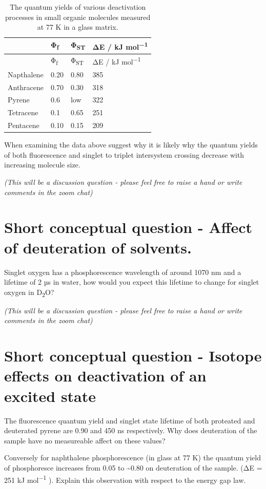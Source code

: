 \documentclass[
]{book}
\begin{document}
\begin{longtable}[]{@{}llll@{}}
\caption{\label{tab:smallmolQY} The quantum yields of various deactivation processes in small organic molecules measured at 77 K in a glass matrix.}\tabularnewline
\toprule
& Φ\textsubscript{f} & Φ\textsubscript{ST} & ΔE / kJ mol\textsuperscript{−1}\tabularnewline
\midrule
\endfirsthead
\toprule
& Φ\textsubscript{f} & Φ\textsubscript{ST} & ΔE / kJ mol\textsuperscript{−1}\tabularnewline
\midrule
\endhead
Napthalene & 0.20 & 0.80 & 385\tabularnewline
Anthracene & 0.70 & 0.30 & 318\tabularnewline
Pyrene & 0.6 & low & 322\tabularnewline
Tetracene & 0.1 & 0.65 & 251\tabularnewline
Pentacene & 0.10 & 0.15 & 209\tabularnewline
\bottomrule
\end{longtable}

When examining the data above suggest why it is likely why the quantum yields of both fluorescence and singlet to triplet intersystem crossing decrease with increasing molecule size.

\emph{(This will be a discussion question - please feel free to raise a hand or write comments in the zoom chat)}

\hypertarget{sec:dsolvent}{%
\section{Short conceptual question - Affect of deuteration of solvents.}\label{sec:dsolvent}}

Singlet oxygen has a phosphorescence wavelength of around 1070 nm and a lifetime of 2 µs in water, how would you expect this lifetime to change for singlet oxygen in D\textsubscript{2}O?

\emph{(This will be a discussion question - please feel free to raise a hand or write comments in the zoom chat)}

\hypertarget{sec:isotope}{%
\section{Short conceptual question - Isotope effects on deactivation of an excited state}\label{sec:isotope}}

The fluorescence quantum yield and singlet state lifetime of both proteated and deuterated pyrene are 0.90 and 450 ns respectively. Why does deuteration of the sample have no measureable affect on these values?

Conversely for naphthalene phosphorescence (in glass at 77 K) the quantum yield of phosphoresce increases from 0.05 to \textasciitilde0.80 on deuteration of the sample. (ΔE = 251 kJ mol\textsuperscript{−1} ). Explain this observation with respect to the energy gap law.
\end{document}
